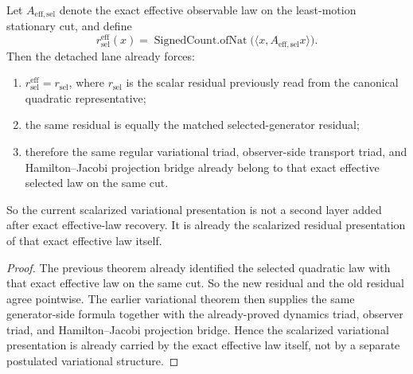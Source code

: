 \begin{theorem}
\label{thm:the-scalarized-variational-residual-is-already-the-residual-of-the-exact-effective-law}
Let \(A_{\mathrm{eff},\mathrm{sel}}\) denote the exact effective observable law
on the least-motion stationary cut, and define
\[
r^{\mathrm{eff}}_{\mathrm{sel}}(x)=
\operatorname{SignedCount.ofNat}\!\bigl(\langle x,A_{\mathrm{eff},\mathrm{sel}}x\rangle\bigr).
\]
Then the detached lane already forces:
\begin{enumerate}
\item \(r^{\mathrm{eff}}_{\mathrm{sel}}=r_{\mathrm{sel}}\), where
      \(r_{\mathrm{sel}}\) is the scalar residual previously read from the
      canonical quadratic representative;
\item the same residual is equally the matched selected-generator residual;
\item therefore the same regular variational triad, observer-side transport
      triad, and Hamilton--Jacobi projection bridge already belong to that
      exact effective selected law on the same cut.
\end{enumerate}
So the current scalarized variational presentation is not a second layer added
after exact effective-law recovery. It is already the scalarized residual
presentation of that exact effective law itself.
\end{theorem}

\begin{proof}
The previous theorem already identified the selected quadratic law with that
exact effective law on the same cut. So the new residual and the old residual
agree pointwise. The earlier variational theorem then supplies the same
generator-side formula together with the already-proved dynamics triad,
observer triad, and Hamilton--Jacobi projection bridge. Hence the scalarized
variational presentation is already carried by the exact effective law itself,
not by a separate postulated variational structure.
\end{proof}

